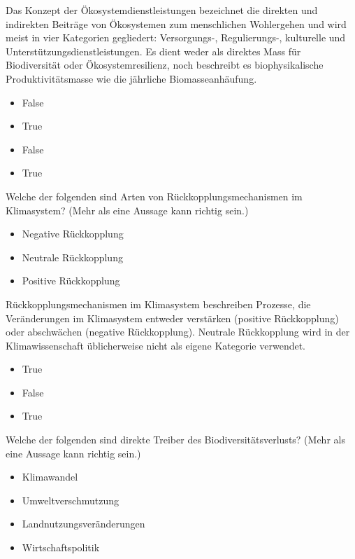 \documentclass[
  nswissgerman,
  a4paper,
  DIV=11,
  numbers=noendperiod,
  oneside,
  openany]{scrreprt}
\providecommand{\tightlist}{%
  \setlength{\itemsep}{0pt}\setlength{\parskip}{0pt}}
\begin{document}
Das Konzept der Ökosystemdienstleistungen bezeichnet die direkten und
indirekten Beiträge von Ökosystemen zum menschlichen Wohlergehen und
wird meist in vier Kategorien gegliedert: Versorgungs-, Regulierungs-,
kulturelle und Unterstützungsdienstleistungen. Es dient weder als
direktes Mass für Biodiversität oder Ökosystemresilienz, noch beschreibt
es biophysikalische Produktivitätsmasse wie die jährliche
Biomasseanhäufung.

\begin{itemize}
\tightlist
\item
  False
\item
  True
\item
  False
\item
  True
\end{itemize}

Welche der folgenden sind Arten von Rückkopplungsmechanismen im
Klimasystem? (Mehr als eine Aussage kann richtig sein.)

\begin{itemize}
\tightlist
\item[$\square$]
  Negative Rückkopplung
\item[$\square$]
  Neutrale Rückkopplung
\item[$\square$]
  Positive Rückkopplung
\end{itemize}

Rückkopplungsmechanismen im Klimasystem beschreiben Prozesse, die
Veränderungen im Klimasystem entweder verstärken (positive Rückkopplung)
oder abschwächen (negative Rückkopplung). Neutrale Rückkopplung wird in
der Klimawissenschaft üblicherweise nicht als eigene Kategorie
verwendet.

\begin{itemize}
\tightlist
\item
  True
\item
  False
\item
  True
\end{itemize}

Welche der folgenden sind direkte Treiber des Biodiversitätsverlusts?
(Mehr als eine Aussage kann richtig sein.)

\begin{itemize}
\tightlist
\item[$\square$]
  Klimawandel
\item[$\square$]
  Umweltverschmutzung
\item[$\square$]
  Landnutzungsveränderungen
\item[$\square$]
  Wirtschaftspolitik
\end{itemize}
\end{document}
